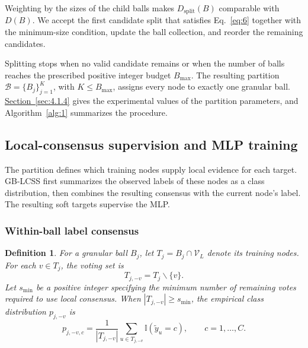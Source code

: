 \documentclass[10pt,letterpaper,nopreprintline]{elsarticle}
\theoremstyle{plain}
\newtheorem{definition}{Definition}
\begin{document}
Weighting by the sizes of the child balls makes \(D_{\mathrm{split}}(B)\) comparable with \(D(B)\). We accept the first candidate split that satisfies Eq.~\eqref{eq:6} together with the minimum-size condition, update the ball collection, and reorder the remaining candidates.

Splitting stops when no valid candidate remains or when the number of balls reaches the prescribed positive integer budget \(B_{\max}\). The resulting partition \(\mathcal{B} = \{ B_{j}\}_{j = 1}^{K}\), with \(K \leq B_{\max}\), assigns every node to exactly one granular ball. \hyperref[sec:4.1.4]{Section~\ref*{sec:4.1.4}} gives the experimental values of the partition parameters, and Algorithm~\ref{alg:1} summarizes the procedure.



\subsection{Local-consensus supervision and MLP training}\label{sec:3.3}

The partition defines which training nodes supply local evidence for each target. GB-LCSS first summarizes the observed labels of these nodes as a class distribution, then combines the resulting consensus with the current node's label. The resulting soft targets supervise the MLP.

\subsubsection{Within-ball label consensus}\label{sec:3.3.1}

\begin{definition}
For a granular ball \(B_{j}\), let \(T_{j} = B_{j} \cap \mathcal{V}_{L}\) denote its training nodes. For each \(v \in T_{j}\), the voting set is
\begin{equation}\label{eq:7}
T_{j, - v} = T_{j}\backslash\{ v\}.
\end{equation}
Let \(s_{\min}\) be a positive integer specifying the minimum number of remaining votes required to use local consensus. When \(\left| T_{j, - v} \right| \geq s_{\min}\), the empirical class distribution \(p_{j, - v}\) is
\begin{equation}\label{eq:8}
p_{j, - v,c} = \frac{1}{|T_{j, - v}|}\sum_{u \in T_{j, - v}}{\mathbb{I}({\widetilde{y}}_{u} = c)},\quad\quad c = 1,\ldots,C.
\end{equation}
\end{definition}
\end{document}

